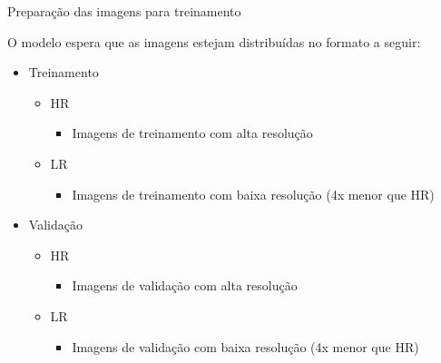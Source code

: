 \documentclass{beamer}
\begin{document}
    \begin{frame}{Preparação das imagens para treinamento}{\thesection \, \secname}

        O modelo espera que as imagens estejam distribuídas no formato a seguir:

        \begin{itemize}
            \item Treinamento
            \begin{itemize}
                \item HR
                \begin{itemize}
                    \item Imagens de treinamento com alta resolução
                \end{itemize}  

                \item LR 
                \begin{itemize}
                    \item Imagens de treinamento com baixa resolução (4x menor que HR)
                \end{itemize}        
            \end{itemize}        
            \item Validação
            \begin{itemize}
                \item HR
                \begin{itemize}
                    \item Imagens de validação com alta resolução 
                \end{itemize}        
                \item LR 
                \begin{itemize}
                    \item Imagens de validação com baixa resolução (4x menor que HR)
                \end{itemize}        
            \end{itemize}        
        \end{itemize}

    \end{frame}
\end{document}
